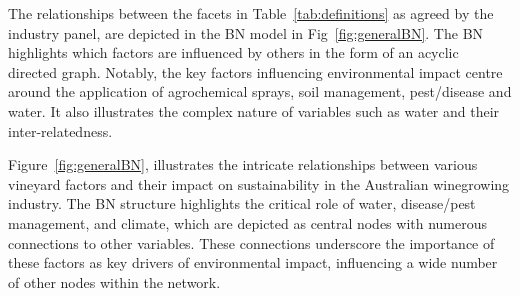 \documentclass[fleqn,10pt]{wlscirep}
\begin{document}
The relationships between the facets in Table~\ref{tab:definitions}  as agreed by the industry panel, are depicted in the BN model in Fig~\ref{fig:generalBN}. The BN highlights which factors are influenced by others in the form of an acyclic directed graph. Notably, the key factors influencing environmental impact centre around the application of agrochemical sprays, soil management, pest/disease and water. It also illustrates the complex nature of variables such as water and their inter-relatedness.


% 



Figure~\ref{fig:generalBN}, illustrates the intricate relationships between various vineyard factors and their impact on sustainability in the Australian winegrowing industry. The BN structure highlights the critical role of water, disease/pest management, and climate, which are depicted as central nodes with numerous connections to other variables. These connections underscore the importance of these factors as key drivers of environmental impact, influencing a wide number of other nodes within the network.
\end{document}
